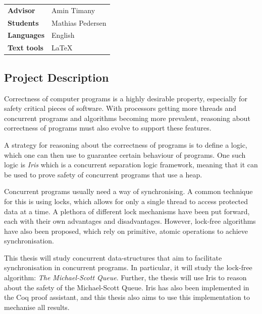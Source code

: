\documentclass{article}
\begin{document}
\pagestyle{fancy}

\bgroup{}
\begin{table}[h]
\begin{tabular}{ll}
\textbf{Advisor}     & Amin Timany \\
\textbf{Students}    & Mathias Pedersen \\
\textbf{Languages}   & English \\
\textbf{Text tools}  & \LaTeX \\
\end{tabular}
\end{table}
\egroup\vspace{-0.cm}

\subsection*{Project Description}
Correctness of computer programs is a highly desirable property, especially for safety critical pieces of software. With processors getting more threads and concurrent programs and algorithms becoming more prevalent, reasoning about correctness of programs must also evolve to support these features.

A strategy for reasoning about the correctness of programs is to define a logic, which one can then use to guarantee certain behaviour of programs. One such logic is \textit{Iris} which is a concurrent separation logic framework, meaning that it can be used to prove safety of concurrent programs that use a heap.

Concurrent programs usually need a way of synchronising. A common technique  for this is using locks, which allows for only a single thread to access protected data at a time. A plethora of different lock mechanisms have been put forward, each with their own advantages and disadvantages. However, lock-free algorithms have also been proposed, which rely on primitive, atomic operations to achieve synchronisation.

This thesis will study concurrent data-structures that aim to facilitate synchronisation in concurrent programs. In particular, it will study the lock-free algorithm: \textit{The Michael-Scott Queue}. Further, the thesis will use Iris to reason about the safety of the Michael-Scott Queue. Iris has also been implemented in the Coq proof assistant, and this thesis also aims to use this implementation to mechanise all results.
\end{document}
